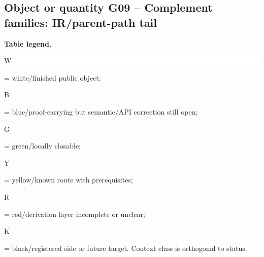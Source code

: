 \subsection*{Object or quantity G09 -- Complement families: IR/\allowbreak{}parent-path tail}
\hypertarget{objproof:G09}{}
\par\smallskip\noindent\begin{minipage}{0.99\linewidth}\footnotesize\raggedright\textbf{Table legend.} \colorbox{white}{\strut W} = white/finished public object; \colorbox{cyan!20}{\strut B} = blue/proof-carrying but semantic/API correction still open; \colorbox{green!18}{\strut G} = green/locally closable; \colorbox{yellow!25}{\strut Y} = yellow/known route with prerequisites; \colorbox{red!20}{\strut R} = red/derivation layer incomplete or unclear; \colorbox{black!18}{\strut K} = black/registered side or future target. Context class is orthogonal to status.\end{minipage}\par\vspace{0.25em}
